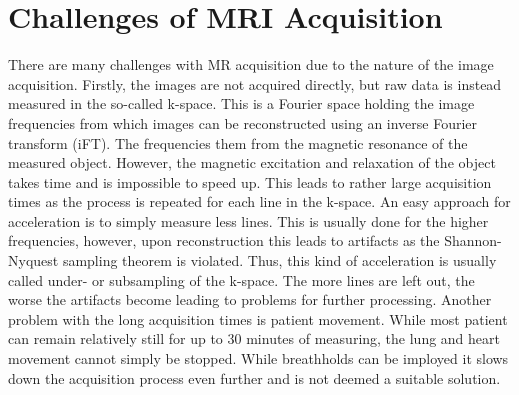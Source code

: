\section{Challenges of MRI Acquisition} \label{Sec:ChallengesMRIAcquisition}
There are many challenges with MR acquisition due to the nature of the image acquisition. Firstly, the images are not acquired directly, but raw data is instead measured in the so-called k-space. This is a Fourier space holding the image frequencies from which images can be reconstructed using an inverse Fourier transform (iFT). The frequencies them from the magnetic resonance of the measured object. However, the magnetic excitation and relaxation of the object takes time and is impossible to speed up. This leads to rather large acquisition times as the process is repeated for each line in the k-space. An easy approach for acceleration is to simply measure less lines. This is usually done for the higher frequencies, however, upon reconstruction this leads to artifacts as the Shannon-Nyquest sampling theorem is violated. Thus, this kind of acceleration is usually called under- or subsampling of the k-space. The more lines are left out, the worse the artifacts become leading to problems for further processing. Another problem with the long acquisition times is patient movement. While most patient can remain relatively still for up to 30 minutes of measuring, the lung and heart movement cannot simply be stopped. While breathholds can be imployed it slows down the acquisition process even further and is not deemed a suitable solution.

